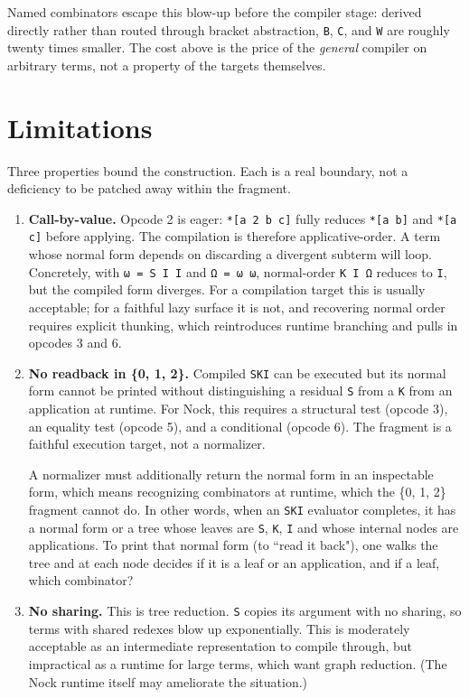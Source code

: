 \documentclass[twoside]{article}
\begin{document}
Named combinators escape this blow-up before the compiler stage:  derived directly rather than routed through bracket abstraction, \texttt{B}, \texttt{C}, and \texttt{W} are roughly twenty times smaller. The cost above is the price of the \emph{general} compiler on
arbitrary terms, not a property of the targets themselves.

\section{Limitations}
\label{sxn:limitations}

Three properties bound the construction. Each is a real boundary, not a deficiency to be patched away within the fragment.

\begin{enumerate}
\item \textbf{Call-by-value.} Opcode 2 is eager: \lstinline[style=inlinecode]{*[a 2 b c]} fully reduces \lstinline[style=inlinecode]{*[a b]} and \lstinline[style=inlinecode]{*[a c]} before applying.  The compilation is therefore applicative-order.  A term whose normal form depends on discarding a divergent subterm will loop.  Concretely, with \texttt{ω = S I I} and \texttt{Ω = ω ω}, normal-order \texttt{K I Ω} reduces to \lstinline[style=inlinecode]{I}, but the compiled form diverges.  For a compilation target this is usually acceptable; for a faithful lazy surface it is not, and recovering normal order requires explicit thunking, which reintroduces runtime branching and pulls in opcodes 3 and 6.

\item \textbf{No readback in \{0, 1, 2\}.} Compiled \texttt{SKI} can be executed but its normal form cannot be printed without distinguishing a residual \lstinline[style=inlinecode]{S} from a \lstinline[style=inlinecode]{K} from an application at runtime. For Nock, this requires a structural test (opcode 3), an equality test (opcode 5), and a conditional (opcode 6). The fragment is a faithful execution target, not a normalizer.

A normalizer must additionally return the normal form in an inspectable form, which means recognizing combinators at runtime, which the \{0, 1, 2\} fragment cannot do.  In other words, when an \texttt{SKI} evaluator completes, it has a normal form or a tree whose leaves are \texttt{S}, \texttt{K}, \texttt{I} and whose internal nodes are applications.  To print that normal form (to ``read it back"), one walks the tree and at each node decides if it is a leaf or an application, and if a leaf, which combinator?

\item \textbf{No sharing.}  This is tree reduction. \lstinline[style=inlinecode]{S} copies its argument with no sharing, so terms with shared redexes blow up exponentially.  This is moderately acceptable as an intermediate representation to compile through, but impractical as a runtime for large terms, which want graph reduction.  (The Nock runtime itself may ameliorate the situation.)
\end{enumerate}
\end{document}
